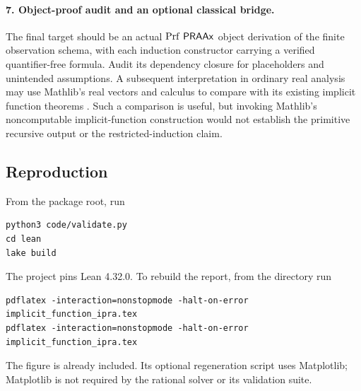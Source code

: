 \paragraph{7. Object-proof audit and an optional classical bridge.}
The final target should be an actual
\(\operatorname{Prf}\,\mathsf{PRAAx}\) object derivation of the finite
observation schema, with each induction constructor
carrying a verified quantifier-free formula.
Audit its dependency closure for placeholders and
unintended assumptions. A subsequent interpretation
in ordinary real analysis may use Mathlib's real
vectors and calculus to compare with its existing
implicit function theorems \cite{mathlib}.
Such a comparison is useful, but invoking Mathlib's
noncomputable implicit-function construction would
not establish the primitive recursive output or
the restricted-induction claim.

\subsection{Reproduction}

From the package root, run
\begin{lstlisting}
python3 code/validate.py
cd lean
lake build
\end{lstlisting}
The project pins Lean 4.32.0. To rebuild the report,
from the  directory run
\begin{lstlisting}
pdflatex -interaction=nonstopmode -halt-on-error implicit_function_ipra.tex
pdflatex -interaction=nonstopmode -halt-on-error implicit_function_ipra.tex
\end{lstlisting}
The figure is already included. Its optional regeneration
script uses Matplotlib; Matplotlib is not required by
the rational solver or its validation suite.
